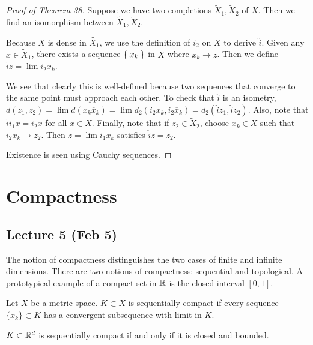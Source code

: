\documentclass[10pt, twoside]{article}
\begin{document}
    \begin{proof}[Proof of Theorem 38] Suppose we have two completions
        $\tilde{X}_1, \tilde{X}_2$ of $X$. Then we find an isomorphism between
        $\tilde{X}_1, \tilde{X}_2$. 
            
            Because $X$ is dense in $\tilde{X_1}$, we use the definition of
            $i_2$ on $X$ to derive $\hat{i}$. Given any $x \in \tilde{X}_1$,
            there exists a sequence $\Set{x_k}$ in $X$ where $x_k \rightarrow
            z$. Then we define $\hat{i}z = \lim i_2x_k$. 
            
            We see that clearly this is well-defined because two sequences that
            converge to the same point must approach each other. To check that
            $\hat{i}$ is an isometry, $d(z_1, z_2) = \lim d(x_k \overline{x}_k)
            = \lim d_2(i_2x_k, i_2\overline{x}_k) = d_2(\hat{i}z_1,
            \hat{i}z_2)$. Also, note that $\hat{i}i_1x = i_2x$ for all $x \in
            X$. Finally, note that if $z_2 \in \tilde{X}_2$, choose $x_k \in X$
            such that $i_2x_k \rightarrow z_2$. Then $z=\lim i_1x_k$ satisfies
            $\hat{i}z = z_2$.

            Existence is seen using Cauchy sequences.  \end{proof}

    \section{Compactness}

    \subsection{Lecture 5 (Feb 5)}

    

    The notion of compactness distinguishes the two cases of finite and
    infinite dimensions. There are two notions of compactness: sequential and
    topological. A prototypical example of a compact set in $\mathbb{R}$ is the closed
    interval $[0,1]$.

    \begin{defn} Let $X$ be a metric space. $K \subset X$
    is sequentially compact if every sequence $\{x_k\} \subset K$ has a
convergent subsequence with limit in $K$.  \end{defn}

    \begin{thm} $K \subset \mathbb{R}^d$ is sequentially compact if and
    only if it is closed and bounded.  \end{thm}
\end{document}
